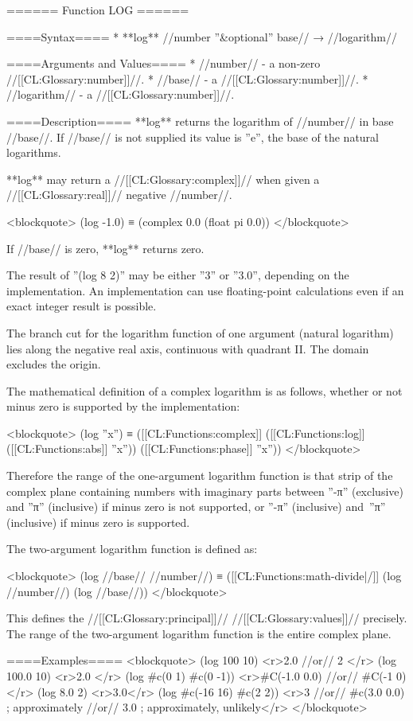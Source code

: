 ====== Function LOG ======

====Syntax====
  * **log** //number ''&optional'' base// → //logarithm//

====Arguments and Values====
  * //number// - a non-zero //[[CL:Glossary:number]]//.
  * //base// - a //[[CL:Glossary:number]]//.
  * //logarithm// - a //[[CL:Glossary:number]]//.

====Description====
**log** returns the logarithm of //number// in base //base//. If //base// is not supplied its value is ''e'', the base of the natural logarithms.

**log** may return a //[[CL:Glossary:complex]]// when given a //[[CL:Glossary:real]]// negative //number//.

<blockquote>
(log -1.0) ≡ (complex 0.0 (float pi 0.0))
</blockquote>

If //base// is zero, **log** returns zero.

The result of ''(log 8 2)'' may be either ''3'' or ''3.0'', depending on the implementation. An implementation can use floating-point calculations even if an exact integer result is possible.

The branch cut for the logarithm function of one argument (natural logarithm) lies along the negative real axis, continuous with quadrant II. The domain excludes the origin.

The mathematical definition of a complex logarithm is as follows, whether or not minus zero is supported by the implementation:

<blockquote>
(log ''x'') ≡ ([[CL:Functions:complex]] ([[CL:Functions:log]] ([[CL:Functions:abs]] ''x'')) ([[CL:Functions:phase]] ''x''))
</blockquote>

Therefore the range of the one-argument logarithm function is that strip of the complex plane containing numbers with imaginary parts between ''-π'' (exclusive) and ''π'' (inclusive) if minus zero is not supported, or ''-π'' (inclusive) and~''π'' (inclusive) if minus zero is supported.

The two-argument logarithm function is defined as:

<blockquote>
(log //base// //number//) ≡ ([[CL:Functions:math-divide|/]] (log //number//) (log //base//))
</blockquote>

This defines the //[[CL:Glossary:principal]]// //[[CL:Glossary:values]]// precisely. The range of the two-argument logarithm function is the entire complex plane.

====Examples====
<blockquote>
(log 100 10) <r>2.0 
//or// 2 </r>
(log 100.0 10) <r>2.0 </r>
(log #c(0 1) #c(0 -1)) <r>#C(-1.0 0.0) 
//or// #C(-1 0)</r>
(log 8.0 2) <r>3.0</r>
(log #c(-16 16) #c(2 2)) <r>3 
//or// #c(3.0 0.0) ; approximately
//or// 3.0 ; approximately, unlikely</r>
</blockquote>

